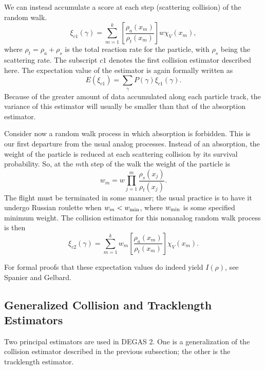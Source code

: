 \documentclass[12pt]{report}
\begin{document}
We can instead accumulate a score at each step (scattering collision)
of the random walk.
\begin{equation}
\xi_{c1}(\gamma) = \sum_{m=1}^{k} \left[ 
\frac{ \rho_{a} (x_{m}) }{ \rho_{t} (x_{m}) } \right] w
\chi_{V} (x_{m}), 
\end{equation}
where $\rho_{t} = \rho_{a} + \rho_{s}$ is the total reaction
rate for the particle, with $\rho_{s}$ being the scattering
rate. The subscript $c1$ denotes the first collision estimator
described here. The expectation value of the estimator is again
formally written as
\begin{equation}
E(\xi_{c1}) = \sum_{\gamma} P(\gamma) \xi_{c1}(\gamma).
\end{equation}
Because of the greater amount of data accumulated along each particle
track, the variance of this estimator will usually be smaller
than that of the absorption estimator.

Consider now a random walk process in which absorption is forbidden.
This is our first departure from the usual analog processes.
Instead of an absorption, the weight of the particle is reduced
at each scattering collision by its survival probability.
So, at the $m$th step of the walk the weight of the particle is
\begin{equation}
w_{m} = w  \prod_{j=1}^{m} \frac{ \rho_{s} (x_{j}) }{ \rho_{t} (x_{j}) }.
\end{equation}
The flight must be terminated in some manner; the usual practice
is to have it undergo Russian roulette\cite{Span69} when 
$w_{m} < w_{\rm min}$, where $w_{\rm min}$ is some specified 
minimum weight. The collision estimator for this nonanalog
random walk process is then
\begin{equation}
\xi_{c2}(\gamma) = \sum_{m=1}^{k} w_{m} \left[ 
\frac{ \rho_{a} (x_{m}) }{ \rho_{t} (x_{m}) } \right]
\chi_{V} (x_{m}).
\label{nonanalog}
\end{equation}

For formal proofs that these expectation values do indeed yield $I(\rho)$,
see Spanier and Gelbard\cite{Span69}.

\subsection{Generalized Collision and Tracklength Estimators}
\label{generalest}

Two principal
estimators are used in DEGAS 2. One is a generalization of the 
collision estimator described in the previous subsection; the other
is the tracklength estimator.
\end{document}
